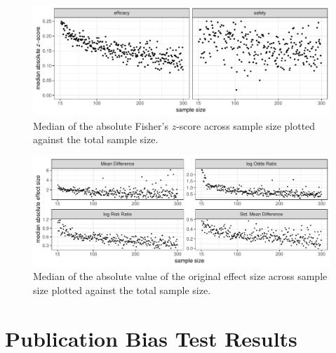 \documentclass[11pt,a4paper,twoside]{book}\usepackage[]{graphicx}\usepackage[]{color}
\newenvironment{knitrout}{}{} %
\begin{document}
\begin{figure}
\begin{knitrout}
\color{fgcolor}

{\centering \includegraphics[width=\textwidth-3cm]{figure/ch03_figunnamed-chunk-10-1} 

}



\end{knitrout}
\caption{Median of the absolute Fisher's $z$-score across sample size plotted against the total sample size.}
\label{z.samplesize}
\end{figure}

\begin{figure}
\begin{knitrout}
\color{fgcolor}

{\centering \includegraphics[width=\textwidth-3cm]{figure/ch03_figunnamed-chunk-11-1} 

}



\end{knitrout}
\caption{Median of the absolute value of the original effect size across sample size plotted against the total sample size.}
\label{effect.samplesize.separated}
\end{figure}



\section{Publication Bias Test Results} \label{sec:publication.bias.tests}
\end{document}
